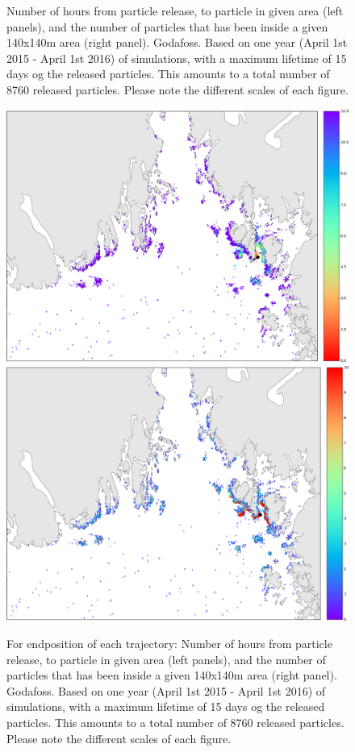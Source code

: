 \begin{figure}[ht]
{}
\caption{\small
Number of hours from particle release, to particle in given area (left panels), and the number of particles that has been inside a given 140x140m area (right panel). Godafoss. Based on one year (April 1st 2015 - April 1st 2016) of simulations, with a maximum lifetime of 15 days og the released particles. This amounts to a total number of 8760 released particles. Please note the different scales of each figure.}
\label{fig:opendrift_godafoss1}
\end{figure}

\begin{figure}[ht]
\centerline{
\includegraphics*[width=.5\textwidth]{Figurer/opendrift/opendrift_godafoss_shortest_time_zoom_endpos_crop}
\includegraphics*[width=.5\textwidth]{Figurer/opendrift/opendrift_godafoss_consentration_zoom_endpos_crop}
}
\caption{\small
For endposition of each trajectory: Number of hours from particle release, to particle in given area (left panels), and the number of particles that has been inside a given 140x140m area (right panel). Godafoss. Based on one year (April 1st 2015 - April 1st 2016) of simulations, with a maximum lifetime of 15 days og the released particles. This amounts to a total number of 8760 released particles. Please note the different scales of each figure.}
\label{fig:opendrift_godafoss2}
\end{figure}

\clearpage 


\clearpage 
